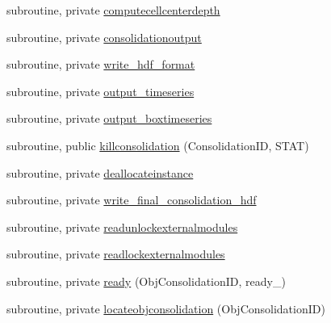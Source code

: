 \begin{DoxyCompactItemize}
\item 
subroutine, private \mbox{\hyperlink{namespacemoduleconsolidation_a3620cbc84f4868b17ace877ad56c903e}{computecellcenterdepth}}
\item 
subroutine, private \mbox{\hyperlink{namespacemoduleconsolidation_ade260a3416dd427c11f719144f5eb362}{consolidationoutput}}
\item 
subroutine, private \mbox{\hyperlink{namespacemoduleconsolidation_ae7ca7200e9ac29d962cff15374878a4e}{write\+\_\+hdf\+\_\+format}}
\item 
subroutine, private \mbox{\hyperlink{namespacemoduleconsolidation_aaca2f5ea993ad6f34b1699f8fccfe168}{output\+\_\+timeseries}}
\item 
subroutine, private \mbox{\hyperlink{namespacemoduleconsolidation_a18a3f871c1e0bfbadc4c99e69e5216ec}{output\+\_\+boxtimeseries}}
\item 
subroutine, public \mbox{\hyperlink{namespacemoduleconsolidation_accff619eab55fc89b79de8070dbd7001}{killconsolidation}} (Consolidation\+ID, S\+T\+AT)
\item 
subroutine, private \mbox{\hyperlink{namespacemoduleconsolidation_ac59ee6a9bf70ef4f2f509cc55bb5b242}{deallocateinstance}}
\item 
subroutine, private \mbox{\hyperlink{namespacemoduleconsolidation_abab71f3745fefbe658e80b47d85e3662}{write\+\_\+final\+\_\+consolidation\+\_\+hdf}}
\item 
subroutine, private \mbox{\hyperlink{namespacemoduleconsolidation_a146c8502b0f191abd1664acdcd22a4c4}{readunlockexternalmodules}}
\item 
subroutine, private \mbox{\hyperlink{namespacemoduleconsolidation_a5157e525fb069b7984e826def43a4dfc}{readlockexternalmodules}}
\item 
subroutine, private \mbox{\hyperlink{namespacemoduleconsolidation_ab6b8d86bedc5c2870f1fb998c297005e}{ready}} (Obj\+Consolidation\+ID, ready\+\_\+)
\item 
subroutine, private \mbox{\hyperlink{namespacemoduleconsolidation_a782ed1b2a1870dc38bceeca90e360669}{locateobjconsolidation}} (Obj\+Consolidation\+ID)
\end{DoxyCompactItemize}
